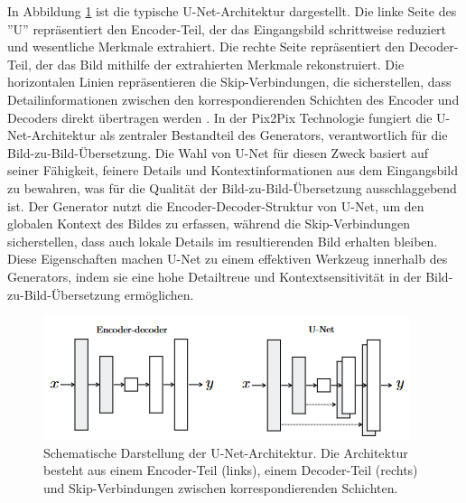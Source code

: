 In Abbildung \ref{fig:unet} ist die typische U-Net-Architektur dargestellt. Die linke Seite des ''U'' repräsentiert den Encoder-Teil, der das Eingangsbild schrittweise reduziert und wesentliche Merkmale extrahiert. Die rechte Seite repräsentiert den Decoder-Teil, der das Bild mithilfe der extrahierten Merkmale rekonstruiert. Die horizontalen Linien repräsentieren die Skip-Verbindungen, die sicherstellen, dass Detailinformationen zwischen den korrespondierenden Schichten des Encoder und Decoders direkt übertragen werden \cite{PhillipIsola.}. \newline 
In der Pix2Pix Technologie fungiert die U-Net-Architektur als zentraler Bestandteil des Generators, verantwortlich für die Bild-zu-Bild-Übersetzung. Die Wahl von U-Net für diesen Zweck basiert auf seiner Fähigkeit, feinere Details und Kontextinformationen aus dem Eingangsbild zu bewahren, was für die Qualität der Bild-zu-Bild-Übersetzung ausschlaggebend ist. Der Generator nutzt die Encoder-Decoder-Struktur von U-Net, um den globalen Kontext des Bildes zu erfassen, während die Skip-Verbindungen sicherstellen, dass auch lokale Details im resultierenden Bild erhalten bleiben. Diese Eigenschaften machen U-Net zu einem effektiven Werkzeug innerhalb des Generators, indem sie eine hohe Detailtreue und Kontextsensitivität in der Bild-zu-Bild-Übersetzung ermöglichen\cite{PhillipIsola.}.

\begin{figure}[h]
	\centering
	\includegraphics[width=0.7\linewidth]{./images/unet.png}
	\caption{Schematische Darstellung der U-Net-Architektur. Die Architektur besteht aus einem Encoder-Teil (links), einem Decoder-Teil (rechts) und Skip-Verbindungen zwischen korrespondierenden Schichten.}
	\label{fig:unet}
\end{figure}

